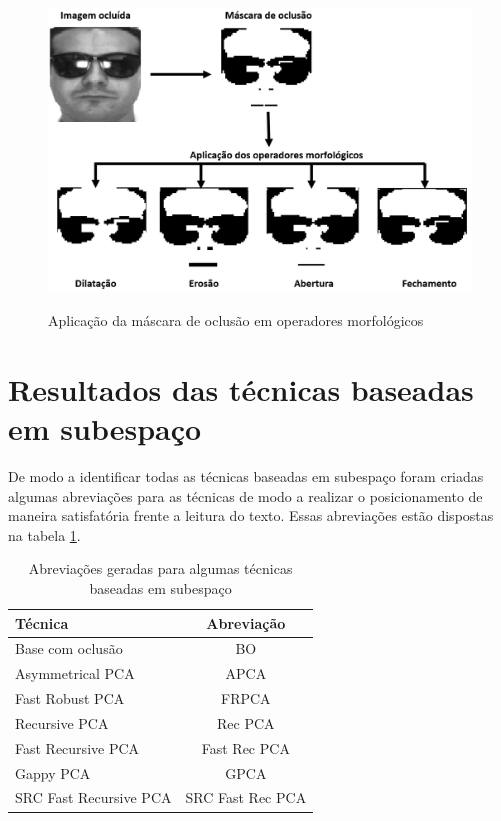 \begin{figure}[H]
\centering
\caption{Aplicação da máscara de oclusão em operadores morfológicos}
\includegraphics[scale = 0.5]{imgs3/mascara_oclusao}
\label{fig:operadoresmorfologicos}
\end{figure}





\section{Resultados das técnicas baseadas em subespaço}

De modo a identificar todas as técnicas baseadas em subespaço foram criadas algumas abreviações para as técnicas de modo a realizar o posicionamento de maneira satisfatória frente a leitura do texto. Essas abreviações estão dispostas na tabela \ref{tab:tecnicas_subespaco}.

\begin{table}[htpb]
	\centering
	\caption{Abreviações geradas para algumas técnicas baseadas em subespaço}
    \label{tab:tecnicas_subespaco}
	\begin{tabular}{|l|c|} \hline

		\textbf{Técnica}	& \textbf{Abreviação}  \\ \hline
		Base com oclusão  & BO  \\ \hline
		Asymmetrical PCA  & APCA  \\ \hline
		Fast Robust PCA & FRPCA \\ \hline
		Recursive PCA   &	 Rec PCA \\ \hline
		Fast Recursive PCA &	 Fast Rec PCA  \\ \hline
		Gappy PCA &	 GPCA  \\ \hline
		SRC Fast Recursive PCA & SRC Fast Rec PCA \\ \hline 
	\end{tabular}
\end{table}

